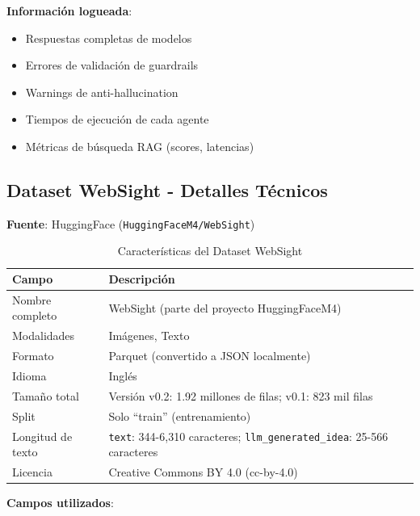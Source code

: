 \documentclass[12pt,a4paper]{article}
\begin{document}
\textbf{Información logueada}:
\begin{itemize}
    \item Respuestas completas de modelos
    \item Errores de validación de guardrails
    \item Warnings de anti-hallucination
    \item Tiempos de ejecución de cada agente
    \item Métricas de búsqueda RAG (scores, latencias)
\end{itemize}

\subsection{Dataset WebSight - Detalles Técnicos}

\textbf{Fuente}: HuggingFace (\texttt{HuggingFaceM4/WebSight})

\begin{table}[H]
\centering
\caption{Características del Dataset WebSight}
\begin{tabular}{lp{10cm}}
\toprule
\textbf{Campo} & \textbf{Descripción} \\
\midrule
Nombre completo & WebSight (parte del proyecto HuggingFaceM4) \\
Modalidades & Imágenes, Texto \\
Formato & Parquet (convertido a JSON localmente) \\
Idioma & Inglés \\
Tamaño total & Versión v0.2: 1.92 millones de filas; v0.1: 823 mil filas \\
Split & Solo ``train'' (entrenamiento) \\
Longitud de texto & \texttt{text}: 344-6,310 caracteres; \texttt{llm\_generated\_idea}: 25-566 caracteres \\
Licencia & Creative Commons BY 4.0 (cc-by-4.0) \\
\bottomrule
\end{tabular}
\end{table}

\textbf{Campos utilizados}:
\end{document}
